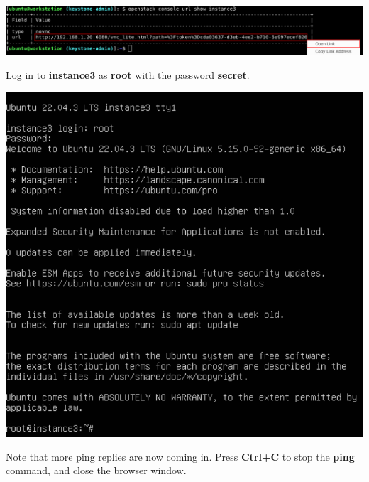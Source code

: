 \documentclass[letterpaper, 12pt]{article}
\begin{document}
\begin{enumerate}
\begin{labstep}
        \begin{center}
            \includegraphics[width=\linewidth]{images/part4/step13.png}
        \end{center}
    \end{labstep}

    \begin{labstep}
        Log in to \textbf{instance3} as \textbf{root} with the password \textbf{secret}.

        \begin{center}
            \includegraphics[width=\linewidth]{images/part4/step14.png}
        \end{center}
    \end{labstep}

    \begin{labstep}
        Note that more ping replies are now coming in.
        Press \textbf{Ctrl+C} to stop the \textbf{ping} command, and close the browser window.


\end{labstep}
\end{enumerate}
\end{document}
